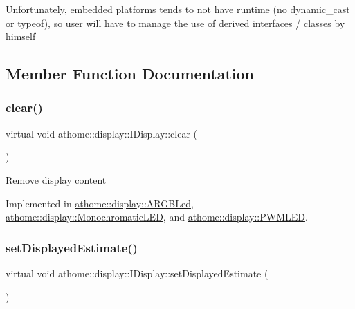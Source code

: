 Unfortunately, embedded platforms tends to not have runtime (no {\ttfamily dynamic\+\_\+cast} or {\ttfamily typeof}), so user will have to manage the use of derived interfaces / classes by himself 

\subsection{Member Function Documentation}
\mbox{\label{classathome_1_1display_1_1_i_display_a0d3add1ce61c96657827fb56d250d9c6}} 
\subsubsection{\texorpdfstring{clear()}{clear()}}
{\footnotesize\ttfamily virtual void athome\+::display\+::\+I\+Display\+::clear (\begin{DoxyParamCaption}{ }\end{DoxyParamCaption})\hspace{0.3cm}{\ttfamily [pure virtual]}}

Remove display content 

Implemented in \mbox{\hyperlink{classathome_1_1display_1_1_a_r_g_b_led_a9753e3a23ea5cb6b0a41079bc6128766}{athome\+::display\+::\+A\+R\+G\+B\+Led}}, \mbox{\hyperlink{classathome_1_1display_1_1_monochromatic_l_e_d_a81a1470c33e639e916f014e5adbe8707}{athome\+::display\+::\+Monochromatic\+L\+ED}}, and \mbox{\hyperlink{classathome_1_1display_1_1_p_w_m_l_e_d_ad13265bec1900a48d3d89aac9a532783}{athome\+::display\+::\+P\+W\+M\+L\+ED}}.

\mbox{\label{classathome_1_1display_1_1_i_display_a3c9678f929e4bc04742d458b0c2399ef}} 
\subsubsection{\texorpdfstring{set\+Displayed\+Estimate()}{setDisplayedEstimate()}}
{\footnotesize\ttfamily virtual void athome\+::display\+::\+I\+Display\+::set\+Displayed\+Estimate (\begin{DoxyParamCaption}\item[{\mbox{\hyperlink{classathome_1_1sensor_1_1_i_sensor_aa70bc27a4c17c86caf96cca776541ddf}{sensor\+::\+I\+Sensor\+::\+I\+Sensor\+Scale}}}]{ }\end{DoxyParamCaption})\hspace{0.3cm}{\ttfamily [pure virtual]}}

